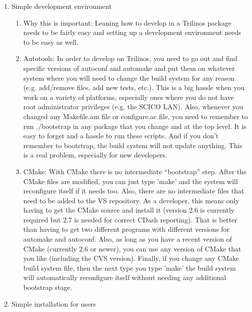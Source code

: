 \documentclass[pdf,ps2pdf,11pt]{SANDreport}
\begin{document}
\begin{enumerate}
\begin{enumerate}
  \end{enumerate}

{}\item Simple development environment

  \begin{enumerate}

  {}\item Why this is important: Leaning how to develop in a Trilinos
  package needs to be fairly easy and setting up a development
  environment needs to be easy as well.

  {}\item Autotools: In order to develop on Trilinos, you need to go
  out and find specific versions of autoconf and automake and put them
  on whatever system where you will need to change the build system
  for any reason (e.g. add/remove files, add new tests, etc.).  This
  is a big hassle when you work on a variety of platforms, especially
  ones where you do not have root administrator privileges (e.g. the
  SCICO LAN).  Also, whenever you changed any Makefile.am file or
  configure.ac file, you need to remember to run ./bootstrap in any
  package that you change and at the top level.  It is easy to forget
  and a hassle to run these scripts.  And if you don't remember to
  bootstrap, the build system will not update anything.  This is a
  real problem, especially for new developers.

  {}\item CMake: With CMake there is no intermediate ``bootstrap''
  step.  After the CMake files are modified, you can just type 'make'
  and the system will reconfigure itself if it needs too. Also, there
  are no intermediate files that need to be added to the VS
  repository.  As a developer, this means only having to get the CMake
  source and install it (version 2.6 is currently required but 2.7 is
  needed for correct CDash reporting).  That is better than having to
  get two different programs with different versions for automake and
  autoconf.  Also, as long as you have a recent version of CMake
  (currently 2.6 or newer), you can use any version of CMake that you
  like (including the CVS version).  Finally, if you change any CMake
  build system file, then the next type you type 'make' the build
  system will automatically reconfigure itself without needing any
  additional bootstrap stage.

  \end{enumerate}

{}\item Simple installation for users


\end{enumerate}
\end{document}
